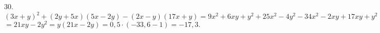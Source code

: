 30. $(3x+y)^2+(2y+5x)(5x-2y)-(2x-y)(17x+y)=9x^2+6xy+y^2+25x^2-4y^2-34x^2-2xy+17xy+y^2=$\\$=21xy-2y^2=y(21x-2y)=0,5\cdot(-33,6-1)=-17,3.$\\
